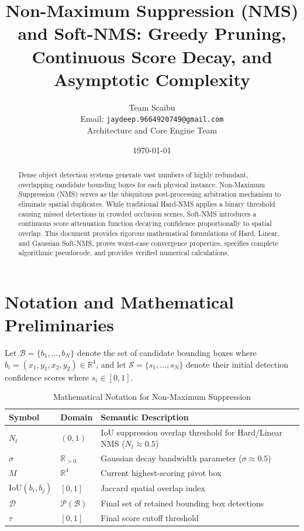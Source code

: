 \documentclass[11pt,a4paper]{article}
\title{Non-Maximum Suppression (NMS) and Soft-NMS: Greedy Pruning, Continuous Score Decay, and Asymptotic Complexity}
\author{Team Scaibu \\ \small Email: \texttt{jaydeep.9664920749@gmail.com} \\ \small Architecture and Core Engine Team}
\date{\today}
\theoremstyle{definition}
\begin{document}
\maketitle

\begin{abstract}
Dense object detection systems generate vast numbers of highly redundant, overlapping candidate bounding boxes for each physical instance. Non-Maximum Suppression (NMS) serves as the ubiquitous post-processing arbitration mechanism to eliminate spatial duplicates. While traditional Hard-NMS applies a binary threshold causing missed detections in crowded occlusion scenes, Soft-NMS introduces a continuous score attenuation function decaying confidence proportionally to spatial overlap. This document provides rigorous mathematical formulations of Hard, Linear, and Gaussian Soft-NMS, proves worst-case convergence properties, specifies complete algorithmic pseudocode, and provides verified numerical calculations.
\end{abstract}

\section{Notation and Mathematical Preliminaries}

Let $\mathcal{B} = \{b_1, \dots, b_N\}$ denote the set of candidate bounding boxes where $b_i = (x_1, y_1, x_2, y_2) \in \mathbb{R}^4$, and let $\mathcal{S} = \{s_1, \dots, s_N\}$ denote their initial detection confidence scores where $s_i \in [0, 1]$.

\begin{table}[h]
\centering
\caption{Mathematical Notation for Non-Maximum Suppression}
\begin{tabular}{lll}
\toprule
\textbf{Symbol} & \textbf{Domain} & \textbf{Semantic Description} \\
\midrule
$N_t$ & $(0, 1)$ & IoU suppression overlap threshold for Hard/Linear NMS ($N_t \approx 0.5$) \\
$\sigma$ & $\mathbb{R}_{> 0}$ & Gaussian decay bandwidth parameter ($\sigma \approx 0.5$) \\
$M$ & $\mathbb{R}^4$ & Current highest-scoring pivot box \\
$\text{IoU}(b_i, b_j)$ & $[0, 1]$ & Jaccard spatial overlap index \\
$\mathcal{D}$ & $\mathcal{P}(\mathcal{B})$ & Final set of retained bounding box detections \\
$\tau$ & $[0, 1]$ & Final score cutoff threshold \\
\bottomrule
\end{tabular}
\end{table}
\end{document}
